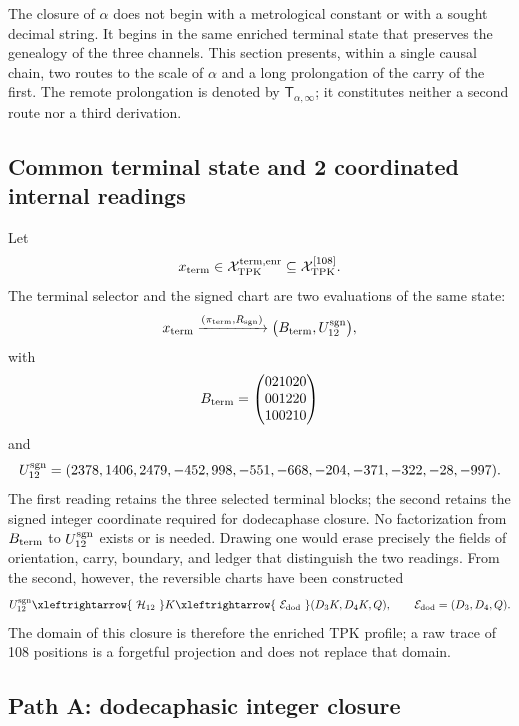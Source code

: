 
\label{sec:alpha-dos-vias-t1-rev8}

The closure of \(\alpha\) does not begin with a metrological constant or with a
sought decimal string. It begins in the same enriched terminal state that
preserves the genealogy of the three channels. This section presents, within a single
causal chain, two routes to the scale of \(\alpha\) and a long prolongation
of the carry of the first. The remote prolongation is denoted by
\(\mathsf T_{\alpha,\infty}\); it constitutes neither a second route nor a third
derivation.

\subsection{Common terminal state and 2 coordinated internal readings}

Let
\[
 x_{\rm term}\in\mathcal X_{\rm TPK}^{\rm term,enr}
 \subseteq\mathcal X_{\rm TPK}^{[108]}.
\]
The terminal selector and the signed chart are two evaluations of the same state:
\begin{equation}
 x_{\rm term}
 \xrightarrow{(\pi_{\rm term},R_{\rm sgn})}
 \bigl(B_{\rm term},U_{12}^{\rm sgn}\bigr),
 \label{eq:alpha-rev8-doble-lectura-terminal}
\end{equation}
with
\[
 B_{\rm term}=
 \begin{pmatrix}
 021020\\001220\\100210
 \end{pmatrix}
\]
and
\[
 U_{12}^{\rm sgn}
 =(2378,1406,2479,-452,998,-551,-668,-204,-371,-322,-28,-997).
\]
The first reading retains the three selected terminal blocks; the
second retains the signed integer coordinate required for dodecaphase
closure. No factorization from
\(B_{\rm term}\) to \(U_{12}^{\rm sgn}\) exists or is needed. Drawing one would erase precisely the
fields of orientation, carry, boundary, and ledger that distinguish the two
readings. From the second, however, the reversible charts have been constructed
\[
 U_{12}^{\rm sgn}
 \xleftrightarrow{\ \mathcal H_{12}\ }K
 \xleftrightarrow{\ \mathcal E_{\rm dod}\ }
 (D_3K,D_4K,Q),
 \qquad
 \mathcal E_{\rm dod}=(D_3,D_4,Q).
\]
The domain of this closure is therefore the enriched TPK profile; a
raw trace of 108 positions is a forgetful projection and does not replace that
domain.

\subsection{Path A: dodecaphasic integer closure}

